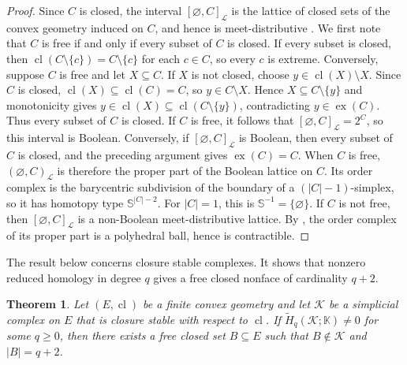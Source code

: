 \documentclass[11pt]{amsart}
\newtheorem{theorem}{Theorem}[section]
\newtheorem{lemma}[theorem]{Lemma}
\theoremstyle{definition}
\newcommand{\cl}{\operatorname{cl}}
\newcommand{\ex}{\operatorname{ex}}
\newcommand{\kk}{\mathbb K}
\newcommand{\cL}{\mathcal L}
\begin{document}
\begin{proof}
Since $C$ is closed, the interval $[\varnothing,C]_{\cL}$ is the lattice of closed sets of the convex geometry induced on $C$, and hence is meet-distributive \cite[Theorem~3.3]{Edelman}. We first note that $C$ is free if and only if every subset of $C$ is closed. If every subset is closed, then $\cl(C\setminus\{c\})=C\setminus\{c\}$ for each $c\in C$, so every $c$ is extreme. Conversely, suppose $C$ is free and let $X\subseteq C$. If $X$ is not closed, choose $y\in\cl(X)\setminus X$. Since $C$ is closed, $\cl(X)\subseteq\cl(C)=C$, so $y\in C\setminus X$. Hence $X\subseteq C\setminus\{y\}$ and monotonicity gives $y\in\cl(X)\subseteq\cl(C\setminus\{y\})$, contradicting $y\in\ex(C)$. Thus every subset of $C$ is closed. If $C$ is free, it follows that $[\varnothing,C]_{\cL}=2^C$, so this interval is Boolean. Conversely, if $[\varnothing,C]_{\cL}$ is Boolean, then every subset of $C$ is closed, and the preceding argument gives $\ex(C)=C$. When $C$ is free, $(\varnothing,C)_{\cL}$ is therefore the proper part of the Boolean lattice on $C$. Its order complex is the barycentric subdivision of the boundary of a $(|C|-1)$-simplex, so it has homotopy type $\mathbb{S}^{|C|-2}$. For $|C|=1$, this is $\mathbb{S}^{-1}=\{\varnothing\}$. If $C$ is not free, then $[\varnothing,C]_{\cL}$ is a non-Boolean meet-distributive lattice. By \cite[Corollary~2.2]{BilleraHsiaoProvan}, the order complex of its proper part is a polyhedral ball, hence is contractible.
\end{proof}

The result below concerns closure stable complexes. It shows that nonzero reduced homology in degree $q$ gives a free closed nonface of cardinality $q+2$.

\begin{theorem}\label{thm:2}
Let $(E,\cl)$ be a finite convex geometry and let $\mathcal K$ be a simplicial complex on $E$ that is closure stable with respect to $\cl$. If $\widetilde H_q(\mathcal K;\kk)\ne0$ for some $q\ge0$, then there exists a free closed set $B\subseteq E$ such that $B\notin\mathcal K$ and $|B|=q+2$.
\end{theorem}
\end{document}
